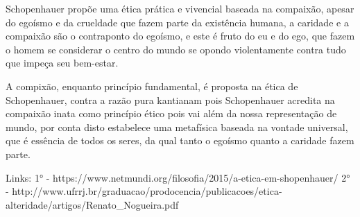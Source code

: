 Schopenhauer propõe uma ética prática e vivencial baseada na compaixão, apesar do egoísmo e da crueldade que fazem parte da existência humana, a caridade e a compaixão são o contraponto do egoísmo, e este é fruto do eu e do ego, que fazem o homem se considerar o centro do mundo se opondo violentamente contra tudo que impeça seu bem-estar.

A compixão, enquanto princípio fundamental, é proposta na ética de Schopenhauer, contra a razão pura kantianam pois Schopenhauer acredita na compaixão inata como princípio ético pois vai além da nossa representação de mundo, por conta disto estabelece uma metafísica baseada na vontade universal, que é essência de todos os seres, da qual tanto o egoísmo quanto a caridade fazem parte.

Links:
1° - https://www.netmundi.org/filosofia/2015/a-etica-em-shopenhauer/
2° - http://www.ufrrj.br/graduacao/prodocencia/publicacoes/etica-alteridade/artigos/Renato_Nogueira.pdf